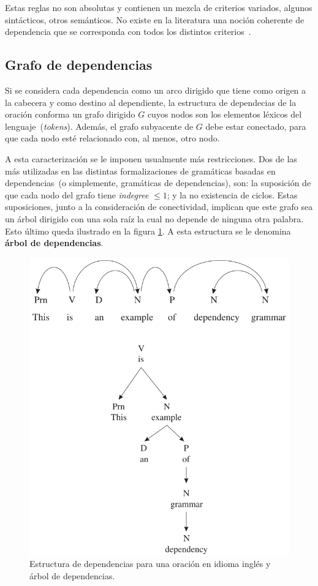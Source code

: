 Estas reglas no son absolutas y contienen un mezcla de criterios variados, algunos sintácticos, otros semánticos.
No existe en la literatura una noción coherente de dependencia que se corresponda con todos los distintos criterios~\cite{nivre2005dependency}.


\subsection{Grafo de dependencias}

Si se considera cada dependencia como un arco dirigido que tiene como origen a la cabecera y como destino al dependiente, la estructura de dependecias de la oración conforma un grafo dirigido $G$ cuyos nodos son los elementos léxicos del lenguaje~(\emph{tokens}).
Además, el grafo subyacente de $G$ debe estar conectado, para que cada nodo esté relacionado con, al menos, otro nodo.

A esta caracterización se le imponen usualmente más restricciones.
Dos de las más utilizadas en las distintas formalizaciones de gramáticas basadas en dependencias~(o simplemente, gramáticas de dependencias), son: la suposición de que cada nodo del grafo tiene \emph{indegree} $\leq 1$; y la no existencia de ciclos.
Estas suposiciones, junto a la consideración de conectividad, implican que este grafo sea un árbol dirigido con una sola raíz la cual no depende de ninguna otra palabra.
Esto último queda ilustrado en la figura \ref{fig:dep_tree}.
A esta estructura se le denomina \textbf{árbol de dependencias}.

\begin{figure}[h!]
	\centering
	\includegraphics[width=0.7\linewidth]{Graphics/dep_tree.png}
	\caption{Estructura de dependencias para una oración en idioma inglés y árbol de dependencias.}\label{fig:dep_tree}
\end{figure}

